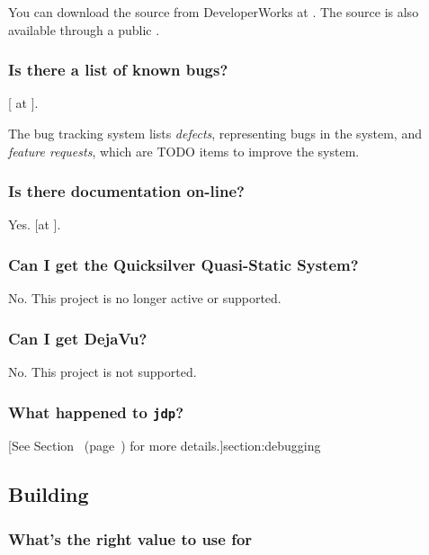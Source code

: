 You can download the \jrvm{} source from DeveloperWorks at \xlink{{\tt
\RVMDownloadURL}}{\RVMDownloadURL}.  The \jrvm{} source is also available
through a public .

\subsubsection{Is there a list of known bugs?}

[ at 
{\tt \RVMBugURL}]{\RVMBugURL}.

The bug tracking system lists {\em defects}, representing bugs in the system, and
{\em feature requests}, which are TODO items to improve the system.

\subsubsection{Is there documentation on-line?}

Yes.  [at
{\tt \RVMHomeURL}]{\RVMHomeURL}.

\subsubsection{Can I get the Quicksilver Quasi-Static System?}

No. This project is no longer active or supported.

\subsubsection{Can I get DejaVu?}

No. This project is not supported. 

\subsubsection{What happened to {\tt jdp}?}

[See
Section~\Ref{} (page~\Pageref) for more details.]{section:debugging}

\subsection{Building \jrvm}


\subsubsection{What's the right value to use for
 }
\label{singleProcessorQuestion}

